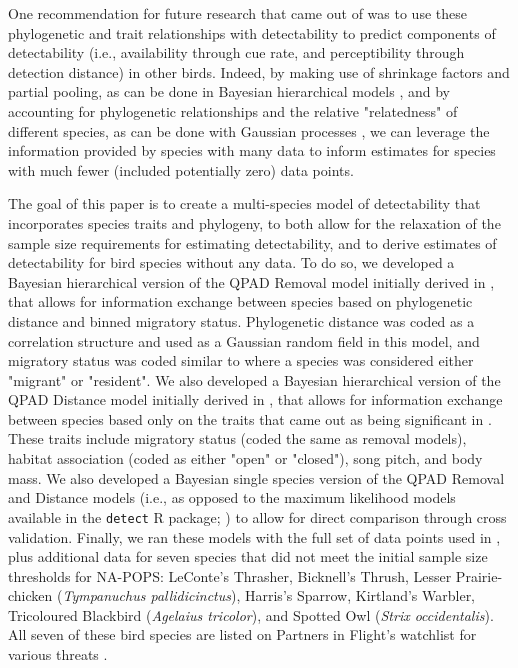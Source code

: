 \documentclass[12pt]{article}
\begin{document}
\par One recommendation for future research that came out of \cite{solymos_phylogeny_2018} was to use these phylogenetic and trait relationships with detectability to predict components of detectability (i.e., availability through cue rate, and perceptibility through detection distance) in other birds.
Indeed, by making use of shrinkage factors and partial pooling, as can be done in Bayesian hierarchical models \citep{gelman_what_2021}, and by accounting for phylogenetic relationships and the relative "relatedness" of different species, as can be done with Gaussian processes \citep{bernardo_regression_1998, mcelreath_continous_2020}, we can leverage the information provided by species with many data to inform estimates for species with much fewer (included potentially zero) data points.

\par The goal of this paper is to create a multi-species model of detectability that incorporates species traits and phylogeny, to both allow for the relaxation of the sample size requirements for estimating detectability, and to derive estimates of detectability for bird species without any data. 
To do so, we developed a Bayesian hierarchical version of the QPAD Removal model initially derived in \cite{solymos_calibrating_2013}, that allows for information exchange between species based on phylogenetic distance and binned migratory status.
Phylogenetic distance was coded as a correlation structure and used as a Gaussian random field in this model, and migratory status was coded similar to \cite{solymos_phylogeny_2018} where a species was considered either "migrant" or "resident".
We also developed a Bayesian hierarchical version of the QPAD Distance model initially derived in \cite{solymos_calibrating_2013}, that allows for information exchange between species based only on the traits that came out as being significant in  \cite{solymos_phylogeny_2018}.
These traits include migratory status (coded the same as removal models), habitat association (coded as either "open" or "closed"), song pitch, and body mass. 
We also developed a Bayesian single species version of the QPAD Removal and Distance models (i.e., as opposed to the maximum likelihood models available in the \texttt{detect} R package; \cite{solymos_detect_2020}) to allow for direct comparison through cross validation.
Finally, we ran these models with the full set of data points used in \cite{edwards_point_2023}, plus additional data for seven species that did not meet the initial sample size thresholds for NA-POPS: LeConte's Thrasher, Bicknell's Thrush, Lesser Prairie-chicken (\textit{Tympanuchus pallidicinctus}), Harris's Sparrow, Kirtland's Warbler, Tricoloured Blackbird (\textit{Agelaius tricolor}), and Spotted Owl (\textit{Strix occidentalis}). 
All seven of these bird species are listed on Partners in Flight's watchlist for various threats \citep{will_handbook_2020}. 
\end{document}
